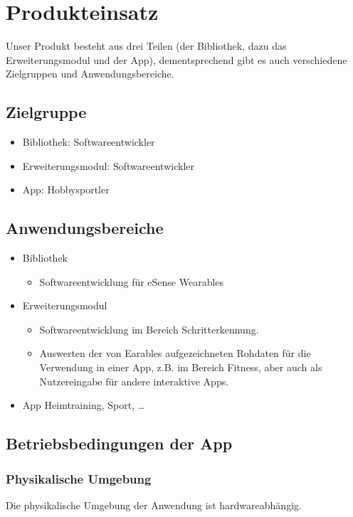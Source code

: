 \documentclass[a4paper,12pt]{article}
\begin{document}
\section{Produkteinsatz}
Unser Produkt besteht aus drei Teilen (der Bibliothek, dazu das Erweiterungsmodul und der App), dementsprechend gibt es auch verschiedene Zielgruppen und Anwendungsbereiche.
  \subsection{Zielgruppe}
  \begin{itemize}
    \item\textsf{Bibliothek:} Softwareentwickler
    \item\textsf{Erweiterungsmodul:} Softwareentwickler
    \item\textsf{App:} Hobbysportler
  \end{itemize}
  \subsection{Anwendungsbereiche}
    \begin{itemize}
      \item\textsf{Bibliothek} 
      \begin{itemize}
        \item Softwareentwicklung für eSense Wearables 
      \end{itemize}
      \item\textsf{Erweiterungsmodul}
      \begin{itemize}
        \item Softwareentwicklung im Bereich Schritterkennung.
        \item Auswerten der von \Gls{Earables} aufgezeichneten Rohdaten für die Verwendung in einer App, z.B. im Bereich Fitness, aber auch als Nutzereingabe für andere interaktive Apps.
      \end{itemize}
      \item\textsf{App} Heimtraining, Sport, \dots
    \end{itemize}
  \subsection{Betriebsbedingungen der App} %
    \subsubsection{Physikalische Umgebung}
      Die physikalische Umgebung der Anwendung ist hardwareabhängig.
\end{document}
